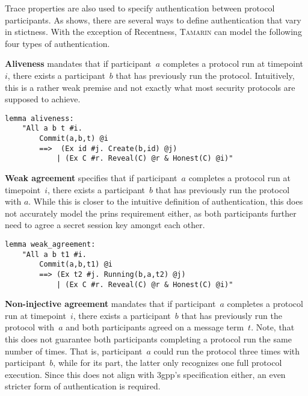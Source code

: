 Trace properties are also used to specify authentication between protocol participants.
As \cite{lowe1997hierarchy} shows, there are several ways to define authentication that vary in stictness.
With the exception of Recentness, \textsc{Tamarin} can model the following four types of authentication.

\textbf{Aliveness} mandates that if participant~$a$ completes a protocol run at timepoint~$i$, there exists a participant~$b$ that has previously run the protocol.
Intuitively, this is a rather weak premise and not exactly what most security protocols are supposed to achieve.

\begin{lstlisting}[caption={Tamarin aliveness query, according to \cite{tamarin2019manual},~p.~74},label={lst:tamarin-aliveness}]
lemma aliveness:
    "All a b t #i.
        Commit(a,b,t) @i
        ==>  (Ex id #j. Create(b,id) @j)
            | (Ex C #r. Reveal(C) @r & Honest(C) @i)"
\end{lstlisting}

\textbf{Weak agreement} specifies that if participant~$a$ completes a protocol run at timepoint~$i$, there exists a participant~$b$ that has previously run the protocol with $a$.
While this is closer to the intuitive definition of authentication, this does not accurately model the \gls{prins} requirement either, as both participants further need to agree a secret session key amongst each other.

\begin{lstlisting}[caption={Tamarin weak agreement query, according to \cite{tamarin2019manual},~p.~75},label={lst:tamarin-wagreement}]
lemma weak_agreement:
    "All a b t1 #i.
        Commit(a,b,t1) @i
        ==> (Ex t2 #j. Running(b,a,t2) @j)
            | (Ex C #r. Reveal(C) @r & Honest(C) @i)"
\end{lstlisting}

\textbf{Non-injective agreement} mandates that if participant~$a$ completes a protocol run at timepoint~$i$, there exists a participant~$b$ that has previously run the protocol with~$a$ and both participants agreed on a message term~$t$.
Note, that this does not guarantee both participants completing a protocol run the same number of times.
That is, participant~$a$ could run the protocol three times with participant~$b$, while for its part, the latter only recognizes one full protocol execution.
Since this does not align with \gls{3gpp}'s specification either, an even stricter form of authentication is required.

